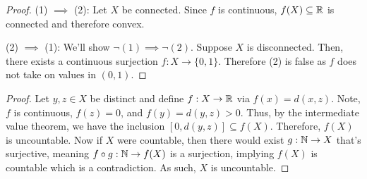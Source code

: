 \documentclass{report}
\begin{document}
\newpage
{}
\begin{proof}
    (1) $\implies$ (2): Let $X$ be connected. Since $f$ is continuous, $f(X) \subseteq \RR$ is connected and therefore convex. 

    (2) $\implies$ (1): We'll show $\neg (1) \implies \neg (2)$. Suppose $X$ is disconnected. Then, there exists a continuous surjection $f: X \to \{0, 1\}$. Therefore (2) is false as $f$ does not take on values in $(0, 1)$. 
\end{proof}
\begin{proof}
    Let $y, z\in X$ be distinct and define $f: X \to \RR$ via $f(x) = d(x, z)$. Note, $f$ is continuous, $f(z) = 0$, and $f(y) = d(y, z) > 0$. Thus, by the intermediate value theorem,  we have the inclusion $[0, d(y, z)] \subseteq f(X)$. Therefore, $f(X)$ is uncountable. Now if $X$ were countable, then there would exist $g: \NN \to X$ that's surjective, meaning $f \circ g : \NN \to f(X)$ is a surjection, implying $f(X)$ is countable which is a contradiction. As such, $X$ is uncountable.
\end{proof}
\end{document}
